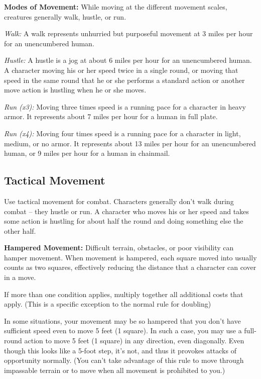 \textbf{Modes of Movement:} While moving at the different movement scales, creatures 
generally walk, hustle, or run.

\textit{Walk:} A walk represents unhurried but purposeful movement at 3 miles per 
hour for an unencumbered human.

\textit{Hustle:} A hustle is a jog at about 6 miles per hour for an unencumbered 
human. A character moving his or her speed twice in a single round, or moving that 
speed in the same round that he or she performs a standard action or another move 
action is hustling when he or she moves.

\textit{Run (x3):} Moving three times speed is a running pace for a character in 
heavy armor. It represents about 7 miles per hour for a human in full plate.

\textit{Run (x4):} Moving four times speed is a running pace for a character 
in light, medium, or no armor. It represents about 13 miles per hour for an unencumbered 
human, or 9 miles per hour for a human in chainmail.

\subsection{Tactical Movement}

Use tactical movement for combat. Characters generally don't walk during combat -- they 
hustle or run. A character who moves his or her speed and takes some action is 
hustling for about half the round and doing something else the other half.

\textbf{Hampered Movement:} Difficult terrain, obstacles, or poor visibility can 
hamper movement. When movement is hampered, each square moved into usually counts 
as two squares, effectively reducing the distance that a character can cover in 
a move. 

If more than one condition applies, multiply together all additional costs that 
apply. (This is a specific exception to the normal rule for doubling) 

In some situations, your movement may be so hampered that you don't have sufficient 
speed even to move 5 feet (1 square). In such a case, you may use a full-round 
action to move 5 feet (1 square) in any direction, even diagonally. Even though 
this looks like a 5-foot step, it's not, and thus it provokes attacks of opportunity 
normally. (You can't take advantage of this rule to move through impassable terrain 
or to move when all movement is prohibited to you.)

